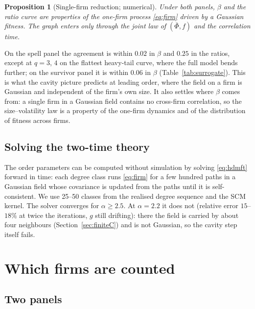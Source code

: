\documentclass[11pt]{article}
\newcommand{\bPhi}{\bar\Phi}
\newtheorem{proposition}{Proposition}
\begin{document}
\begin{proposition}[Single-firm reduction; numerical]\label{prop:reduction}
Under both panels, $\beta$ and the ratio curve are properties of the one-firm process
\eqref{eq:firm} driven by a Gaussian fitness.  The graph enters only through the joint law of
$(\bPhi,f)$ and the correlation time.
\end{proposition}
On the spell panel the agreement is within $0.02$ in $\beta$ and $0.25$ in the ratios, except at
$q=3$, $4$ on the flattest heavy-tail curve, where the full model bends further; on the survivor
panel it is within $0.06$ in $\beta$ (Table~\ref{tab:surrogate}).  This is what the cavity picture predicts at
leading order, where the field on a firm is Gaussian and independent of the firm's own size.  It
also settles where $\beta$ comes from: a single firm in a Gaussian field contains no cross-firm
correlation, so the size--volatility law is a property of the one-firm dynamics and of the
distribution of fitness across firms.

\subsection{Solving the two-time theory}
\label{sec:twotime}

The order parameters can be computed without simulation by solving \eqref{eq:hdmft} forward in
time: each degree class runs \eqref{eq:firm} for a few hundred paths in a Gaussian field whose
covariance is updated from the paths until it is self-consistent.  We use 25--50 classes from
the realised degree sequence and the SCM kernel.  The solver converges for $\alpha\ge2.5$.  At
$\alpha=2.2$ it does not (relative error $15$--$18\%$ at twice the iterations, $g$ still
drifting): there the field is carried by about four neighbours (Section~\ref{sec:finiteC}) and is
not Gaussian, so the cavity step itself fails.

\section{Which firms are counted}
\label{sec:panels}

\subsection{Two panels}
\end{document}
